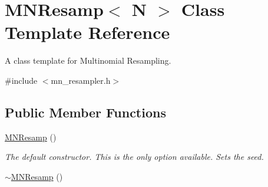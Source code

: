 \hypertarget{classMNResamp}{}\section{M\+N\+Resamp$<$ N $>$ Class Template Reference}
\label{classMNResamp}


A class template for Multinomial Resampling.  




{\ttfamily \#include $<$mn\+\_\+resampler.\+h$>$}

\subsection*{Public Member Functions}
\begin{DoxyCompactItemize}
\item 
\hyperlink{classMNResamp_a5b19989c7ebca4cf6d4cf5b5023714f9}{M\+N\+Resamp} ()\hypertarget{classMNResamp_a5b19989c7ebca4cf6d4cf5b5023714f9}{}\label{classMNResamp_a5b19989c7ebca4cf6d4cf5b5023714f9}

\begin{DoxyCompactList}\small\item\em The default constructor. This is the only option available. Sets the seed. \end{DoxyCompactList}\item 
\hyperlink{classMNResamp_ab7ec18956deafe46729f95003ec593a1}{$\sim$\+M\+N\+Resamp} ()\hypertarget{classMNResamp_ab7ec18956deafe46729f95003ec593a1}{}\label{classMNResamp_ab7ec18956deafe46729f95003ec593a1}


\end{DoxyCompactItemize}
